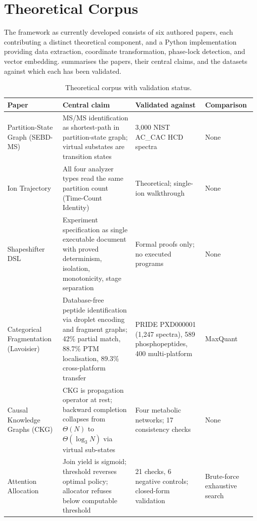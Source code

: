 \documentclass[11pt,a4paper]{article}
\theoremstyle{planstyle}
\theoremstyle{definition}
\theoremstyle{remark}
\begin{document}
\section{Theoretical Corpus}
\label{sec:corpus}

The framework as currently developed consists of six authored papers,
each contributing a distinct theoretical component, and a Python
implementation providing data extraction, coordinate transformation,
phase-lock detection, and vector embedding.  summarises
the papers, their central claims, and the datasets against which each
has been validated.

\begin{table}[htbp]
\centering
\small
\caption{Theoretical corpus with validation status.}
\label{tab:corpus}
\begin{tabular}{@{}p{3.2cm}p{4.8cm}p{3.5cm}p{2.5cm}@{}}
\toprule
\textbf{Paper} & \textbf{Central claim} & \textbf{Validated against} &
\textbf{Comparison} \\
\midrule
Partition-State Graph (SEBD-MS) &
  MS/MS identification as shortest-path in partition-state graph; virtual substates
  are transition states &
  3,000 NIST AC\_CAC HCD spectra &
  None \\[4pt]
Ion Trajectory &
  All four analyzer types read the same partition count (Time-Count Identity) &
  Theoretical; single-ion walkthrough &
  None \\[4pt]
Shapeshifter DSL &
  Experiment specification as single executable document with proved determinism,
  isolation, monotonicity, stage separation &
  Formal proofs only; no executed programs &
  None \\[4pt]
Categorical Fragmentation (Lavoisier) &
  Database-free peptide identification via droplet encoding and fragment graphs;
  42\% partial match, 88.7\% PTM localisation, 89.3\% cross-platform transfer &
  PRIDE PXD000001 (1,247 spectra), 589 phosphopeptides, 400 multi-platform &
  MaxQuant \\[4pt]
Causal Knowledge Graphs (CKG) &
  CKG is propagation operator at rest; backward completion collapses from
  $\Theta(N)$ to $\Theta(\log_3 N)$ via virtual sub-states &
  Four metabolic networks; 17 consistency checks &
  None \\[4pt]
Attention Allocation &
  Join yield is sigmoid; threshold reverses optimal policy;
  allocator refuses below computable threshold &
  21 checks, 6 negative controls; closed-form validation &
  Brute-force exhaustive search \\
\bottomrule
\end{tabular}
\end{table}
\end{document}
